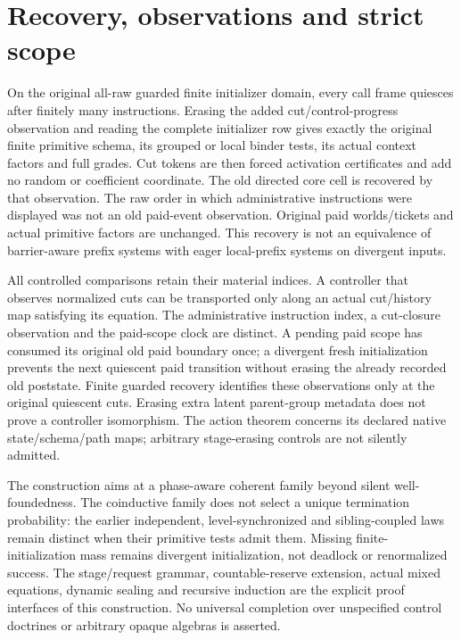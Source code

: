 \documentclass[11pt]{article}
\begin{document}
\section{Recovery, observations and strict scope}
On the original all-raw guarded finite initializer domain, every call frame quiesces after finitely many instructions. Erasing the added cut/control-progress observation and reading the complete initializer row gives exactly the original finite primitive schema, its grouped or local binder tests, its actual context factors and full grades. Cut tokens are then forced activation certificates and add no random or coefficient coordinate. The old directed core cell is recovered by that observation. The raw order in which administrative instructions were displayed was not an old paid-event observation. Original paid worlds/tickets and actual primitive factors are unchanged. This recovery is not an equivalence of barrier-aware prefix systems with eager local-prefix systems on divergent inputs.

All controlled comparisons retain their material indices. A controller that observes normalized cuts can be transported only along an actual cut/history map satisfying its equation. The administrative instruction index, a cut-closure observation and the paid-scope clock are distinct. A pending paid scope has consumed its original old paid boundary once; a divergent fresh initialization prevents the next quiescent paid transition without erasing the already recorded old poststate. Finite guarded recovery identifies these observations only at the original quiescent cuts. Erasing extra latent parent-group metadata does not prove a controller isomorphism. The action theorem concerns its declared native state/schema/path maps; arbitrary stage-erasing controls are not silently admitted.

The construction aims at a phase-aware coherent family beyond silent well-foundedness. The coinductive family does not select a unique termination probability: the earlier independent, level-synchronized and sibling-coupled laws remain distinct when their primitive tests admit them. Missing finite-initialization mass remains divergent initialization, not deadlock or renormalized success. The stage/request grammar, countable-reserve extension, actual mixed equations, dynamic sealing and recursive induction are the explicit proof interfaces of this construction. No universal completion over unspecified control doctrines or arbitrary opaque algebras is asserted.
\end{document}
